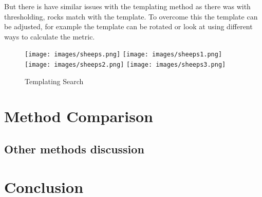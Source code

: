 But there is have similar issues with the templating method as there was with thresholding, rocks match with the template. To overcome this the template can be adjusted, for example the template can be rotated or look at using different ways to calculate the metric.\cite{opencv}
    
    \begin{figure}
    \caption{Templating Search}
        \texttt{[image: images/sheeps.png]}
        \texttt{[image: images/sheeps1.png]}
        \texttt{[image: images/sheeps2.png]}
        \texttt{[image: images/sheeps3.png]}
        \label{sheeps}
    \end{figure}

\section{Method Comparison}

\subsection{Other methods discussion}

\section{Conclusion}